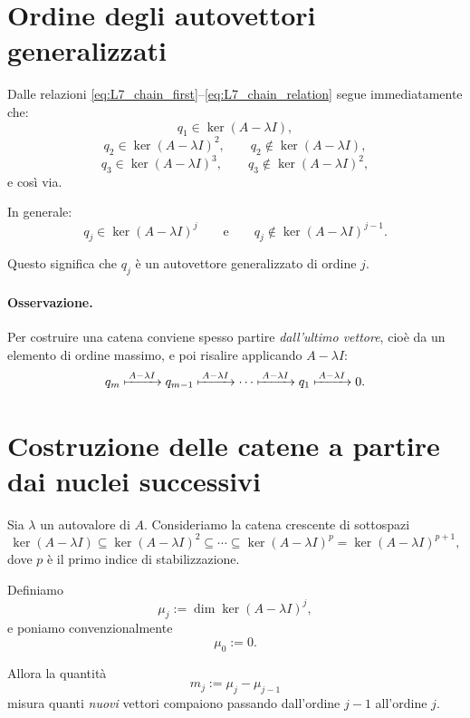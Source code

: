 \section{Ordine degli autovettori generalizzati}

Dalle relazioni \eqref{eq:L7_chain_first}--\eqref{eq:L7_chain_relation} segue immediatamente che:
\[
q_1\in\ker(A-\lambda I),
\]
\[
q_2\in\ker(A-\lambda I)^2,\qquad q_2\notin\ker(A-\lambda I),
\]
\[
q_3\in\ker(A-\lambda I)^3,\qquad q_3\notin\ker(A-\lambda I)^2,
\]
e così via.

In generale:
\begin{equation}
q_j\in\ker(A-\lambda I)^j
\qquad\text{e}\qquad
q_j\notin\ker(A-\lambda I)^{j-1}.
\label{eq:L7_order_generalized}
\end{equation}

Questo significa che $q_j$ è un autovettore generalizzato di ordine $j$.

\paragraph{Osservazione.}
Per costruire una catena conviene spesso partire \emph{dall'ultimo vettore}, cioè da un elemento di ordine massimo, e poi risalire applicando $A-\lambda I$:
\[
q_m \xmapsto{\,A-\lambda I\,} q_{m-1} \xmapsto{\,A-\lambda I\,} \cdots \xmapsto{\,A-\lambda I\,} q_1 \xmapsto{\,A-\lambda I\,} 0.
\]

\section{Costruzione delle catene a partire dai nuclei successivi}

Sia $\lambda$ un autovalore di $A$. Consideriamo la catena crescente di sottospazi
\begin{equation}
\ker(A-\lambda I)\subseteq \ker(A-\lambda I)^2 \subseteq \cdots \subseteq \ker(A-\lambda I)^p=\ker(A-\lambda I)^{p+1},
\label{eq:L7_kernel_chain}
\end{equation}
dove $p$ è il primo indice di stabilizzazione.

Definiamo
\begin{equation}
\mu_j:=\dim\ker(A-\lambda I)^j,
\label{eq:L7_mu_j}
\end{equation}
e poniamo convenzionalmente
\[
\mu_0:=0.
\]

Allora la quantità
\begin{equation}
m_j:=\mu_j-\mu_{j-1}
\label{eq:L7_m_j}
\end{equation}
misura quanti \emph{nuovi} vettori compaiono passando dall'ordine $j-1$ all'ordine $j$.

